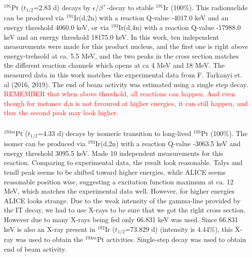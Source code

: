 \subsubsection{}
$^{191}$Pt ($t_{1/2}$=2.83 d) decays by $\epsilon/\beta^+$-decay to stable $^{191}$Ir (100\%). This radionuclide can be produced via $^{191}$Ir(d,2n) with a reaction Q-value -4017.0 keV and an energy threshold 4060.0 keV, or via $^{193}$Ir(d,4n) with a reaction Q-value -17988.0 keV and an energy threshold 18175.0 keV. In this work, ten independent measurements were made for this product nucleus, and the first one is right above energy-trehsold at ca. 5.5 MeV, and the two peaks in the cross section matches the different reaction channels which opens at ca 4 MeV and 18 MeV. The measured data in this work matches the experimental data from F. Tarkanyi et. al (2016, 2019). The end of beam activity was estimated using a single step decay. 
\textcolor{red}{REMEMBER that when above threshold, all reactions can happen. And even though for instance d,n is not favoured at higher energies, it can still happen, and thus the second peak may look higher.  }

\subsubsection{}
$^{193m}$Pt ($t_{1/2}$=4.33 d) decays by isomeric transition to long-lived $^{193}$Pt (100\%). The isomer can be produced via $^{193}$Ir(d,2n) with a reaction Q-value -3063.5 keV and energy threshold 3095.5 keV. Made 10 independent measurements for this reaction. Comparing to experimental data, the result look reasonable. Talys and tendl peak seems to be shifted toward higher energies, while ALICE seems reasonable position wise, suggesting a excitation function maximum at ca. 12 MeV, which matches the experimental data well. However, for higher energies ALICE looks strange. Due to the weak intensity of the gamma-line provided by the IT decay, we had to use X-rays to be sure that we got the right cross section. However due to many X-rays being fed only 66.831 keV was used. Since 66.831 keV is also an X-ray present in $^{192}$Ir ($t_{1/2}$=73.829 d) (intensity is 4.44\%), this X-ray was used to obtain the $^{193m}$Pt activities. Single-step decay was used to obtain end of beam activity. 


